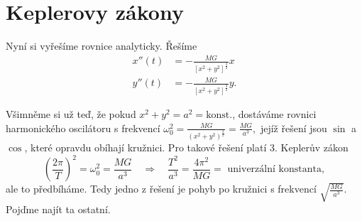 \section{Keplerovy zákony}
Nyní si vyřešíme rovnice analyticky. Řešíme
\begin{align*}
		x''(t) &= -\frac{MG}{[x^2+y^2]^{\frac{3}{2}}}x \\
		y''(t) &= -\frac{MG}{[x^2+y^2]^{\frac{3}{2}}}y.
\end{align*}

Všimněme si už teď, že pokud $x^{2}+y^{2}=a^{2}=\text{konst.}$, dostáváme rovnici harmonického oscilátoru s frekvencí $\omega_0^{2}=\frac{MG}{(x^{2}+y^{2})^{\frac{3}{2}}}=\frac{MG}{a^{3}},$ jejíž řešení jsou $\sin$ a $\cos$, které opravdu obíhají kružnici. Pro takové řešení platí 3. Keplerův zákon
\begin{equation*}
	\left(\frac{2\pi}{T}\right)^{2}=\omega_0^{2}=\frac{MG}{a^{3}}\quad \Rightarrow\quad \frac{T^{2}}{a^{3}} = \frac{4\pi^{2}}{MG} = \text{ univerzální konstanta},
\end{equation*}
ale to předbíháme. Tedy jedno z řešení je pohyb po kružnici s frekvencí $\sqrt{\frac{MG}{a^{3}}}$. Pojďme najít ta ostatní.

